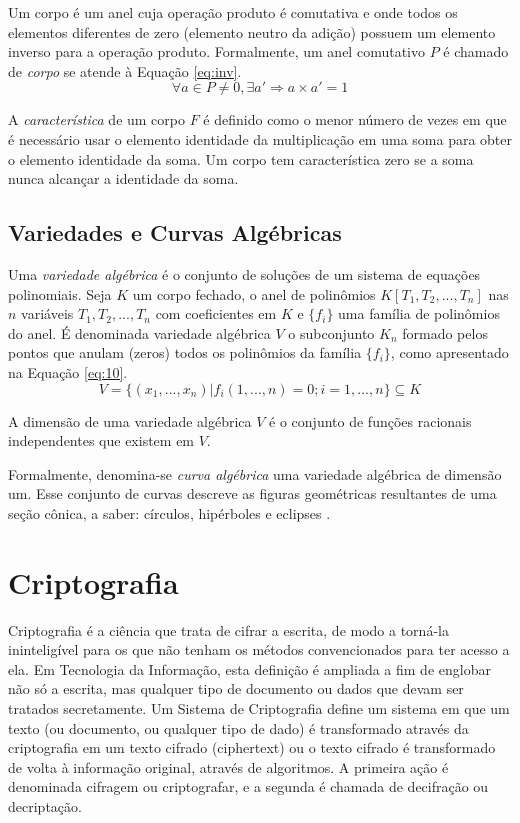 Um corpo é um anel cuja operação produto é comutativa e onde todos os elementos diferentes de zero (elemento neutro da adição) possuem um elemento inverso para a operação produto. Formalmente, um anel comutativo \(P\) é chamado de \textit{corpo} se atende à Equação \ref{eq:inv}.
\begin{equation}
  \forall a \in P \neq {0}, \exists a' \Rightarrow a \times a' = 1
    \label{eq:inv}
\end{equation}

A \textit{característica} de um corpo \(F\) é definido como o menor número de vezes em que é necessário usar o elemento identidade da multiplicação em uma soma para obter o elemento identidade da soma. Um corpo tem característica zero se a soma nunca alcançar a identidade da soma.

%
% 
\subsection{Variedades e Curvas Algébricas}
Uma \textit{variedade algébrica} é o conjunto de soluções de um sistema de equações polinomiais. Seja \(K\) um corpo fechado, o anel de polinômios \(K[T_1 , T_2, ..., T_n ]\) nas \(n\) variáveis \(T_1 , T_2 , ..., T_n \) com coeficientes em \(K\) e \(\{f_{i}\}\) uma família de polinômios do anel. É denominada variedade algébrica \(V\) o subconjunto \(K_n\) formado pelos pontos que anulam (zeros) todos os polinômios da família \(\{f_{i}\}\), como apresentado na Equação \ref{eq:10}.
\begin{equation}
V = \{(x_1 , ..., x_n ) | f_{i}(1, ..., n) = 0; i = 1, ..., n\} \subseteq K \label{eq:10}
\end{equation}

A dimensão de uma variedade algébrica \(V\)  é o conjunto de funções racionais independentes que existem em \(V\).
\par Formalmente,  denomina-se \textit{curva algébrica} uma variedade algébrica de dimensão um. Esse conjunto de curvas descreve as figuras geométricas resultantes de uma seção cônica, a saber: círculos, hipérboles e eclipses \cite{Thomas:2004}.

%
%
\section{Criptografia} \label{sec:criptografia}
Criptografia é a ciência que trata de cifrar a escrita, de modo a torná-la ininteligível para os que não tenham os métodos convencionados para ter acesso a ela. Em Tecnologia da Informação, esta definição é ampliada a fim de englobar não só a escrita, mas qualquer tipo de documento ou dados que devam ser tratados secretamente. Um Sistema de Criptografia define um sistema em que um texto (ou documento, ou qualquer tipo de dado) é transformado através da criptografia em um texto cifrado (ciphertext) ou o texto cifrado é transformado de volta à informação original, através de algoritmos. A primeira ação é denominada cifragem ou criptografar, e a segunda é chamada de decifração ou decriptação. \cite{Portnoi:2005}

